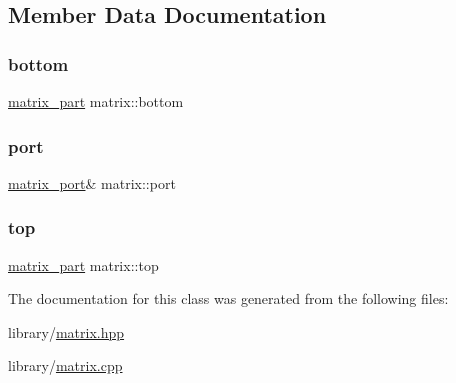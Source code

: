 \subsection{Member Data Documentation}
\mbox{\label{classmatrix_a8a571e0a29b41e59f71d851fa3dfc227}} 
\subsubsection{\texorpdfstring{bottom}{bottom}}
{\footnotesize\ttfamily \hyperlink{classmatrix__part}{matrix\+\_\+part} matrix\+::bottom\hspace{0.3cm}{\ttfamily [private]}}

\mbox{\label{classmatrix_a41ef5702ec1ac3c3e23d6fe12ad58c57}} 
\subsubsection{\texorpdfstring{port}{port}}
{\footnotesize\ttfamily \hyperlink{classmatrix__port}{matrix\+\_\+port}\& matrix\+::port\hspace{0.3cm}{\ttfamily [private]}}

\mbox{\label{classmatrix_ada4fc9c5734e5c7b27fe525bae27be7c}} 
\subsubsection{\texorpdfstring{top}{top}}
{\footnotesize\ttfamily \hyperlink{classmatrix__part}{matrix\+\_\+part} matrix\+::top\hspace{0.3cm}{\ttfamily [private]}}



The documentation for this class was generated from the following files\+:\begin{DoxyCompactItemize}
\item 
library/\hyperlink{matrix_8hpp}{matrix.\+hpp}\item 
library/\hyperlink{matrix_8cpp}{matrix.\+cpp}\end{DoxyCompactItemize}
